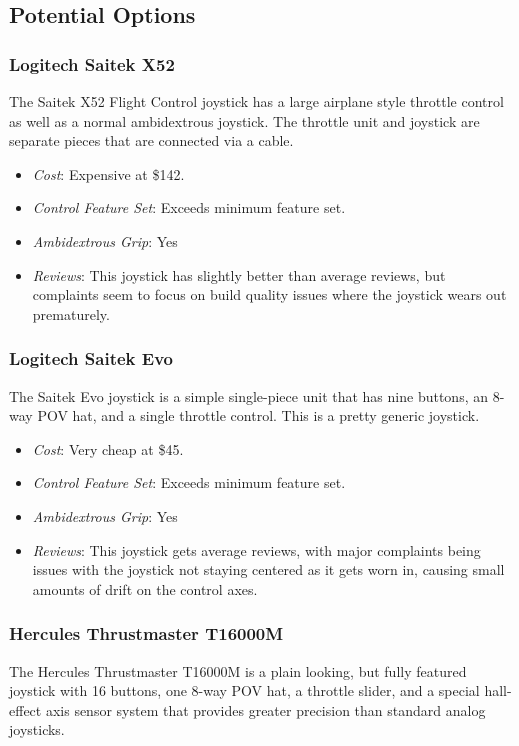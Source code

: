 \documentclass[onecolumn, draftclsnofoot, 10pt, compsoc]{IEEEtran}
\begin{document}
\subsection{Potential Options}
\subsubsection{Logitech Saitek X52}
The Saitek X52 Flight Control joystick has a large airplane style throttle control as well as a normal ambidextrous joystick.
The throttle unit and joystick are separate pieces that are connected via a cable. \cite{x52}

\begin{itemize}
\item \textit{Cost}: Expensive at \$142.
\item \textit{Control Feature Set}: Exceeds minimum feature set.
\item \textit{Ambidextrous Grip}: Yes
\item \textit{Reviews}: This joystick has slightly better than average reviews, but complaints seem to focus on build quality issues where the joystick wears out prematurely.
\end{itemize}

\subsubsection{Logitech Saitek Evo}
The Saitek Evo joystick is a simple single-piece unit that has nine buttons, an 8-way POV hat, and a single throttle control. This is a pretty generic joystick. \cite{evo}

\begin{itemize}
\item \textit{Cost}: Very cheap at \$45.
\item \textit{Control Feature Set}: Exceeds minimum feature set.
\item \textit{Ambidextrous Grip}: Yes
\item \textit{Reviews}: This joystick gets average reviews, with major complaints being issues with the joystick not staying centered as it gets worn in, causing small amounts of drift on the control axes.
\end{itemize}

\subsubsection{Hercules Thrustmaster T16000M}
The Hercules Thrustmaster T16000M is a plain looking, but fully featured joystick with 16 buttons, one 8-way POV hat, a throttle slider, and a special hall-effect axis sensor system that provides greater precision than standard analog joysticks. \cite{thrustmaster}
\end{document}
